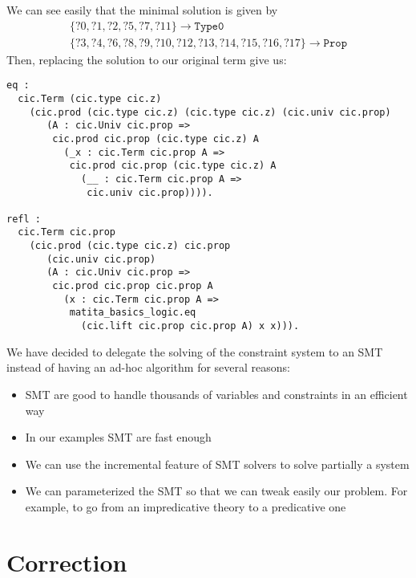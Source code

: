 \documentclass[conference]{IEEEtran}
\newcommand{\universo}{\textsc{Universo}}
\begin{document}
We can see easily that the minimal solution is given by
\begin{align*}
  \{?0,?1,?2,?5,?7,?11\} \to \mathtt{Type0}\\
  \{?3,?4,?6,?8,?9,?10,?12, ?13, ?14, ?15, ?16, ?17\} \to \mathtt{Prop}
\end{align*}
Then, replacing the solution to our original term give us:

\begin{verbatim}
eq :
  cic.Term (cic.type cic.z)
    (cic.prod (cic.type cic.z) (cic.type cic.z) (cic.univ cic.prop)
       (A : cic.Univ cic.prop =>
        cic.prod cic.prop (cic.type cic.z) A
          (_x : cic.Term cic.prop A =>
           cic.prod cic.prop (cic.type cic.z) A
             (__ : cic.Term cic.prop A =>
              cic.univ cic.prop)))).

refl :
  cic.Term cic.prop
    (cic.prod (cic.type cic.z) cic.prop
       (cic.univ cic.prop)
       (A : cic.Univ cic.prop =>
        cic.prod cic.prop cic.prop A
          (x : cic.Term cic.prop A =>
           matita_basics_logic.eq
             (cic.lift cic.prop cic.prop A) x x))).
\end{verbatim}

We have decided to delegate the solving of the constraint system to an SMT instead of having an ad-hoc algorithm for several reasons:
\begin{itemize}
\item SMT are good to handle thousands of variables and constraints in an efficient way
\item In our examples SMT are fast enough
\item We can use the incremental feature of SMT solvers to solve partially a system
\item We can parameterized the SMT so that we can tweak easily our problem. For example, to go from an impredicative theory to a predicative one
\end{itemize}

\section{Correction}


\end{document}
